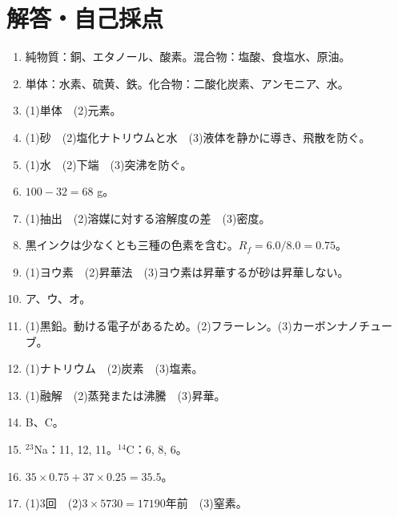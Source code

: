 \documentclass[11pt,a4paper]{ctexart}
\begin{document}
\section*{解答・自己採点}
\small
\begin{enumerate}[label=\textbf{問\arabic*.},leftmargin=14mm]
\item 純物質：銅、エタノール、酸素。混合物：塩酸、食塩水、原油。
\item 単体：水素、硫黄、鉄。化合物：二酸化炭素、アンモニア、水。
\item (1)単体　(2)元素。
\item (1)砂　(2)塩化ナトリウムと水　(3)液体を静かに導き、飛散を防ぐ。
\item (1)水　(2)下端　(3)突沸を防ぐ。
\item $100-32=68$ g。
\item (1)抽出　(2)溶媒に対する溶解度の差　(3)密度。
\item 黒インクは少なくとも三種の色素を含む。$R_f=6.0/8.0=0.75$。
\item (1)ヨウ素　(2)昇華法　(3)ヨウ素は昇華するが砂は昇華しない。
\item ア、ウ、オ。
\item (1)黒鉛。動ける電子があるため。(2)フラーレン。(3)カーボンナノチューブ。
\item (1)ナトリウム　(2)炭素　(3)塩素。
\item (1)融解　(2)蒸発または沸騰　(3)昇華。
\item B、C。
\item ${}^{23}$Na：11, 12, 11。${}^{14}$C：6, 8, 6。
\item $35\times0.75+37\times0.25=35.5$。
\item (1)3回　(2)$3\times5730=17190$年前　(3)窒素。
\end{enumerate}
\fi
\end{document}
